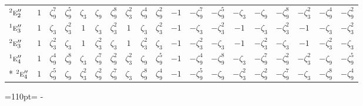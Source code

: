 \documentclass[10pt,a4paper]{article}
\newcommand{\needspace}[1]{\par\penalty-100\begingroup\dimen0=#1\relax\dimen2=\pagegoal
  \advance\dimen2-\pagetotal\ifdim\dimen0>\dimen2\relax\ifdim\dimen2>0pt\vfil\break\fi\fi
  \endgroup}
\numberwithin{equation}{section}
\newcommand{\irr}[1]{\text{\normalfont\scshape #1}}
\newcommand{\conjpair}[1]{{}^{#1}}
\newcommand{\rootunity}[1]{\zeta_{#1}}
\begin{document}
{\begin{longtable}{@{}lcccccccccccccccccc@{}}
$\conjpair{2}\irr{e}_{2}''$ & $1$ & $\rootunity{9}^{7}$ & $\rootunity{9}^{5}$ & $\rootunity{3}$ & $\rootunity{9}$ & $\rootunity{9}^{8}$ & $\rootunity{3}^{2}$ & $\rootunity{9}^{4}$ & $\rootunity{9}^{2}$ & $-1$ & $-\rootunity{9}^{7}$ & $-\rootunity{9}^{5}$ & $-\rootunity{3}$ & $-\rootunity{9}$ & $-\rootunity{9}^{8}$ & $-\rootunity{3}^{2}$ & $-\rootunity{9}^{4}$ & $-\rootunity{9}^{2}$\\
$\conjpair{1}\irr{e}_{3}''$ & $1$ & $\rootunity{3}$ & $\rootunity{3}^{2}$ & $1$ & $\rootunity{3}$ & $\rootunity{3}^{2}$ & $1$ & $\rootunity{3}$ & $\rootunity{3}^{2}$ & $-1$ & $-\rootunity{3}$ & $-\rootunity{3}^{2}$ & $-1$ & $-\rootunity{3}$ & $-\rootunity{3}^{2}$ & $-1$ & $-\rootunity{3}$ & $-\rootunity{3}^{2}$\\
$\conjpair{2}\irr{e}_{3}''$ & $1$ & $\rootunity{3}^{2}$ & $\rootunity{3}$ & $1$ & $\rootunity{3}^{2}$ & $\rootunity{3}$ & $1$ & $\rootunity{3}^{2}$ & $\rootunity{3}$ & $-1$ & $-\rootunity{3}^{2}$ & $-\rootunity{3}$ & $-1$ & $-\rootunity{3}^{2}$ & $-\rootunity{3}$ & $-1$ & $-\rootunity{3}^{2}$ & $-\rootunity{3}$\\
$\conjpair{1}\irr{e}_{4}''$ & $1$ & $\rootunity{9}^{4}$ & $\rootunity{9}^{8}$ & $\rootunity{3}$ & $\rootunity{9}^{7}$ & $\rootunity{9}^{2}$ & $\rootunity{3}^{2}$ & $\rootunity{9}$ & $\rootunity{9}^{5}$ & $-1$ & $-\rootunity{9}^{4}$ & $-\rootunity{9}^{8}$ & $-\rootunity{3}$ & $-\rootunity{9}^{7}$ & $-\rootunity{9}^{2}$ & $-\rootunity{3}^{2}$ & $-\rootunity{9}$ & $-\rootunity{9}^{5}$\\*
$\conjpair{2}\irr{e}_{4}''$ & $1$ & $\rootunity{9}^{5}$ & $\rootunity{9}$ & $\rootunity{3}^{2}$ & $\rootunity{9}^{2}$ & $\rootunity{9}^{7}$ & $\rootunity{3}$ & $\rootunity{9}^{8}$ & $\rootunity{9}^{4}$ & $-1$ & $-\rootunity{9}^{5}$ & $-\rootunity{9}$ & $-\rootunity{3}^{2}$ & $-\rootunity{9}^{2}$ & $-\rootunity{9}^{7}$ & $-\rootunity{3}$ & $-\rootunity{9}^{8}$ & $-\rootunity{9}^{4}$\\
\bottomrule\end{longtable}}
\needspace{110pt}
\end{document}
